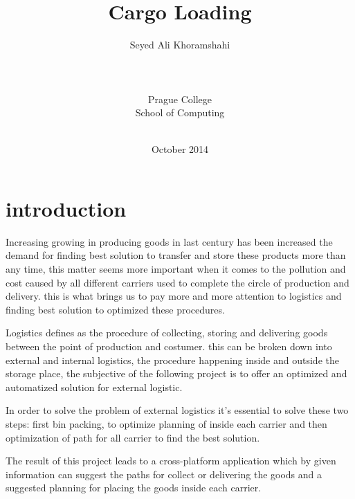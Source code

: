 \documentclass[oneside,titlepage,12pt]{memoir}
\title{Cargo Loading} %
\author{Seyed Ali Khoramshahi\\ \\ \\ \\Prague College\\School of Computing\\ \\ } %
\date{October 2014} %
\begin{document}
\begin{titlingpage}
\maketitle
\end{titlingpage}

\frontmatter %


\tableofcontents* %

\cleartoverso %




\chapter{introduction}
Increasing growing in producing goods in last century has been increased the demand for finding best solution to transfer and store these products more than any time, this matter seems more important when it comes to the pollution and cost caused by all different carriers used to complete the circle of production and delivery. this is what brings us to pay more and more attention to logistics and finding best solution to optimized these procedures. 

 
Logistics defines as the procedure of collecting, storing and delivering goods between the point of production and costumer. this can be broken down into external and internal logistics, the procedure happening inside and outside the storage place, the subjective of the following project is to offer an optimized and automatized solution for external logistic. 

 

In order to solve the problem of external logistics it's essential to solve these two steps: first bin packing, to optimize planning of inside each carrier and then optimization of path for all carrier to find the best solution. 
 

The result of this project leads to a cross-platform application which by given information can suggest the paths for collect or delivering the goods and a suggested planning for placing the goods inside each carrier.
\end{document}
